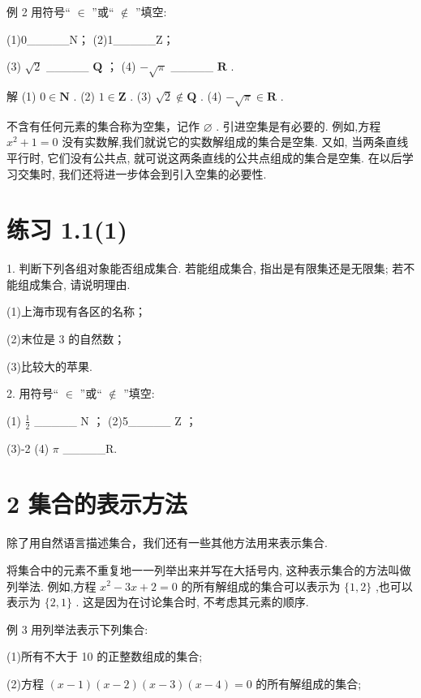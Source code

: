 \documentclass[10pt]{article}
\begin{document}
例 2 用符号“ \(\in\) ”或“ \(\notin\) ”填空:

(1)0\_\_\_\_\_N； (2)1\_\_\_\_\_Z；

(3) \(\sqrt{2}\) \_\_\_\_\_ \(\mathbf{Q}\) ； (4) \(- \sqrt{\pi }\) \_\_\_\_\_ \(\mathbf{R}\) .

解 (1) \(0 \in  \mathbf{N}\) . (2) \(1 \in  \mathbf{Z}\) . (3) \(\sqrt{2} \notin  \mathbf{Q}\) . (4) \(- \sqrt{\pi } \in  \mathbf{R}\) .

不含有任何元素的集合称为空集，记作 \(\varnothing\) . 引进空集是有必要的. 例如,方程 \({x}^{2} + 1 = 0\) 没有实数解,我们就说它的实数解组成的集合是空集. 又如, 当两条直线平行时, 它们没有公共点, 就可说这两条直线的公共点组成的集合是空集. 在以后学习交集时, 我们还将进一步体会到引入空集的必要性.





\section*{练习 1.1(1)}

1. 判断下列各组对象能否组成集合. 若能组成集合, 指出是有限集还是无限集; 若不能组成集合, 请说明理由.

(1)上海市现有各区的名称；

(2)末位是 3 的自然数；

(3)比较大的苹果.

2. 用符号“ \(\in\) ”或“ \(\notin\) ”填空:

(1) \(\frac{1}{2}\) \_\_\_\_\_ \(\mathrm{N}\) ； (2)5\_\_\_\_\_ \(\mathrm{Z}\) ；

(3)-2 (4) \(\pi\) \_\_\_\_\_R.

\section*{2 集合的表示方法}

除了用自然语言描述集合，我们还有一些其他方法用来表示集合.

将集合中的元素不重复地一一列举出来并写在大括号内, 这种表示集合的方法叫做列举法. 例如,方程 \({x}^{2} - {3x} + 2 = 0\) 的所有解组成的集合可以表示为 \(\{ 1,2\}\) ,也可以表示为 \(\{ 2,1\}\) . 这是因为在讨论集合时, 不考虑其元素的顺序.

例 3 用列举法表示下列集合:

(1)所有不大于 10 的正整数组成的集合;

(2)方程 \(\left( {x - 1}\right) \left( {x - 2}\right) \left( {x - 3}\right) \left( {x - 4}\right)  = 0\) 的所有解组成的集合;
\end{document}

